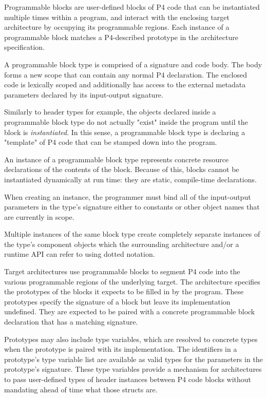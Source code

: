\documentclass[12pt]{article}
\begin{document}
Programmable blocks are user-defined blocks of P4 code that can be
instantiated multiple times within a program, and interact with the enclosing
target architecture by occupying its programmable regions.  Each instance
of a programmable block matches a P4-described prototype in the
architecture specification.


A programmable block type is comprised of a signature and code body. The body
forms a new scope that can contain any normal P4 declaration. The enclosed
code is lexically scoped and additionally has access to the external
metadata parameters declared by its input-output signature.

Similarly to header types for example, the objects declared inside a
programmable block type do not actually "exist" inside the program until
the block is \textit{instantiated}.  In this sense, a programmable block
type is declaring a "template" of P4 code that can be stamped down into the
program.


An instance of a programmable block type represents concrete resource
declarations of the contents of the block.  Because of this, blocks cannot
be instantiated dynamically at run time: they are static, compile-time
declarations.

When creating an instance, the programmer must bind all of the input-output
parameters in the type's signature either to constants or other object names
that are currently in scope. 

Multiple instances of the same block type create completely separate
instances of the type's component objects which the surrounding architecture
and/or a runtime API can refer to using dotted notation.


Target architectures use programmable blocks to segment P4 code into the
various programmable regions of the underlying target.  The architecture
specifies the prototypes of the blocks it expects to be filled in by the
program.  These prototypes specify the signature of a block but leave its
implementation undefined.  They are expected to be paired with a concrete
programmable block declaration that has a matching signature.

Prototypes may also include type variables, which are resolved to
concrete types when the prototype is paired with its implementation.  The
identifiers in a prototype's type variable list are available as valid types
for the parameters in the prototype's signature. These type variables provide
a mechanism for architectures to pass user-defined types of header instances
between P4 code blocks without mandating ahead of time what those structs are.
\end{document}

